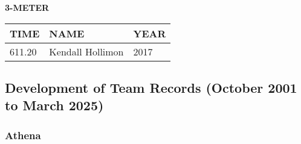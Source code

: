 \vspace{0.4cm}

\begin{center}
\begin{minipage}[t]{0.7\textwidth}
\centering
\textbf{3-METER}\\[0.05cm]
\begin{tabular}{@{}p{1.8cm}p{2.8cm}p{1.2cm}@{}}
\hline
\textbf{TIME} & \textbf{NAME} & \textbf{YEAR} \\
\hline
611.20 & Kendall Hollimon & 2017 \\
\hline
\end{tabular}
\end{minipage}
\end{center}

\vspace{0.4cm}

\newpage

\subsection{Development of Team Records (October 2001 to March 2025)}
\subsubsection{Athena}


